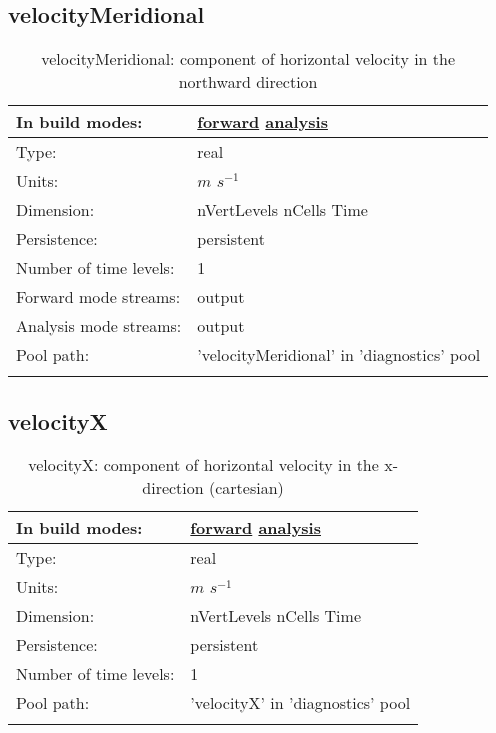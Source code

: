 \subsection[velocityMeridional]{velocityMeridional}
\label{subsec:var_sec_diagnostics_velocityMeridional}
\begin{center}
\begin{longtable}{| p{2.0in} | p{4.0in} |}
        \hline 
        In build modes: & \hyperref[subsec:forward_var_tab_diagnostics]{forward} \hyperref[subsec:analysis_var_tab_diagnostics]{analysis} \\
        \hline 
        Type: & real \\
        \hline 
        Units: & $m$ $s^{-1}$ \\
        \hline 
        Dimension: & nVertLevels nCells Time \\
        \hline 
        Persistence: & persistent \\
        \hline 
        Number of time levels: & 1 \\
        \hline 
		 Forward mode streams: &  output \\
        \hline 
		 Analysis mode streams: &  output \\
        \hline 
            Pool path: & 'velocityMeridional' in 'diagnostics' pool
 \\
		 \hline 
    \caption{velocityMeridional: component of horizontal velocity in the northward direction}
\end{longtable}
\end{center}
\subsection[velocityX]{velocityX}
\label{subsec:var_sec_diagnostics_velocityX}
\begin{center}
\begin{longtable}{| p{2.0in} | p{4.0in} |}
        \hline 
        In build modes: & \hyperref[subsec:forward_var_tab_diagnostics]{forward} \hyperref[subsec:analysis_var_tab_diagnostics]{analysis} \\
        \hline 
        Type: & real \\
        \hline 
        Units: & $m$ $s^{-1}$ \\
        \hline 
        Dimension: & nVertLevels nCells Time \\
        \hline 
        Persistence: & persistent \\
        \hline 
        Number of time levels: & 1 \\
        \hline 
            Pool path: & 'velocityX' in 'diagnostics' pool
 \\
		 \hline 
    \caption{velocityX: component of horizontal velocity in the x-direction (cartesian)}
\end{longtable}
\end{center}
